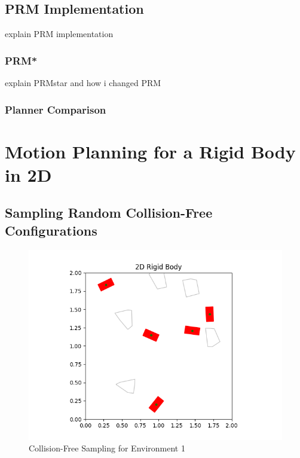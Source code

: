 \documentclass{article}
\begin{document}
\subsection{PRM Implementation}
explain PRM implementation
\subsubsection{PRM*}
explain PRMstar and how i changed PRM
\subsubsection{Planner Comparison}
\maketitle
\section{Motion Planning for a Rigid Body in 2D}
\subsection{Sampling Random Collision-Free Configurations}
\begin{figure}[h!]
	\includegraphics[width= 0.9 \linewidth]{P2_collision_free(1).png}
	\centering
	\caption{Collision-Free Sampling for Environment 1}
	\label{P2_collision_free(1).png}
\end{figure}
\end{document}
